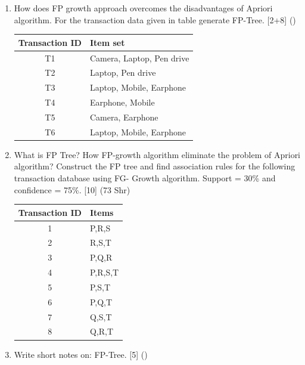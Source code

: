 \documentclass[12pt]{article}
\begin{document}
\begin{enumerate}[topsep=0pt, noitemsep]
      \item How does FP growth approach overcomes the disadvantages of Apriori algorithm. For the transaction data given in table generate FP-Tree. \hfill [2+8] ()\\
        \small
        \begin{tabular}{|c|l|}
          \hline
          Transaction ID & Item set \\ \hline
          T1 & Camera, Laptop, Pen drive \\ \hline
          T2 & Laptop, Pen drive \\ \hline
          T3 & Laptop, Mobile, Earphone \\ \hline
          T4 & Earphone, Mobile \\ \hline
          T5 & Camera, Earphone \\ \hline
          T6 & Laptop, Mobile, Earphone \\ \hline
        \end{tabular}
        \normalsize

      \item What is FP Tree? How FP-growth algorithm eliminate the problem of Apriori algorithm? Construct the FP tree and find association rules for the following transaction database using FG- Growth algorithm. Support = 30\% and confidence = 75\%. \hfill [10] (73 Shr)\\
        \small
        \begin{tabular}{|c|l|}
          \hline
          Transaction ID & Items \\ \hline
          1 & P,R,S \\ \hline
          2 & R,S,T \\ \hline
          3 & P,Q,R \\ \hline
          4 & P,R,S,T \\ \hline
          5 & P,S,T \\ \hline
          6 & P,Q,T \\ \hline
          7 & Q,S,T \\ \hline
          8 & Q,R,T \\ \hline
        \end{tabular}
        \normalsize

      \item Write short notes on: FP-Tree. \hfill [5] ()
    \end{enumerate}
\end{document}
